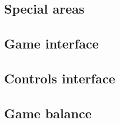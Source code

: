 \subsection{Special areas}

\subsection{Game interface}

\subsection{Controls interface}

\subsection{Game balance}
